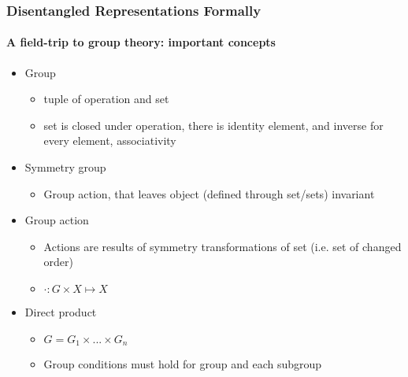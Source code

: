 \documentclass[9pt]{beamer}
\begin{document}
\begin{frame}
\frametitle{Disentangled Representations Formally}
\framesubtitle{A field-trip to group theory: important concepts}
\begin{itemize}%
	\item Group
	\begin{itemize}
		\item tuple of operation and set
		\item set is closed under operation, there is identity element, and inverse for every element, associativity
	\end{itemize}
	\item Symmetry group
	\begin{itemize}
		\item Group action, that leaves object (defined through set/sets) invariant
	\end{itemize}
	\item Group action
	\begin{itemize}
		\item Actions are results of symmetry transformations of set (i.e. set of changed order)
		\item $\cdot :G \times X \mapsto X$
	\end{itemize}
	\item Direct product
	\begin{itemize}
		\item $G = G_1 \times ... \times G_n$
		\item Group conditions must hold for group and each subgroup
	\end{itemize}
\end{itemize}
\end{frame} 
\end{document}

